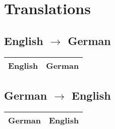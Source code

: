 \documentclass[a4paper, 11pt, accentcolor = tud3b]{tudreport}
\begin{document}
		\section{Translations}
			\subsection{English \(\to\) German}
				\begin{table}[H]
					\centering
					\begin{tabular}{l|l}
						\textbf{English} & \textbf{German} \\ \hline
						
					\end{tabular}
				\end{table}
			
			\subsection{German \(\to\) English}
				\begin{table}[H]
					\centering
					\begin{tabular}{l|l}
						\textbf{German} & \textbf{English} \\ \hline
						
					\end{tabular}
				\end{table}
\end{document}
